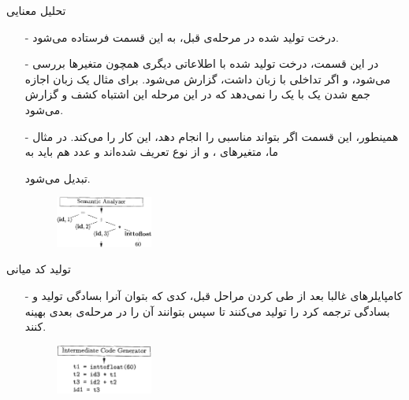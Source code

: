 \begin{frame}{تحلیل معنایی }
\begin{itemize}\itemr
\item[-]
درخت تولید شده در مرحله‌ی قبل، به این قسمت فرستاده می‌شود.

\item[-]
در این قسمت، درخت تولید شده با اطلاعاتی دیگری همچون 
متغیر‌ها بررسی می‌شود، و اگر تداخلی با زبان داشت، گزارش می‌شود. برای مثال یک زبان اجازه جمع شدن یک 
با یک
را نمی‌دهد که در این مرحله این اشتباه کشف و گزارش می‌شود.

\item[-]
همینطور، این قسمت اگر بتواند
مناسبی را انجام دهد، این کار را می‌کند. در مثال ما، متغیر‌های 
،
و 
از نوع
تعریف شده‌اند و عدد 
هم باید به 

تبدیل می‌شود.

\begin{figure}[H]
\begin{center}
\includegraphics[width=0.3\textwidth, height=0.31\textheight]{docs/images/semantic}
\end{center}
\end{figure}
\end{itemize}
\end{frame}


\begin{frame}{تولید کد میانی }
\begin{itemize}\itemr
\item[-]
کامپایلر‌های غالبا بعد از طی کردن مراحل قبل، کدی که بتوان آنرا بسادگی تولید و بسادگی ترجمه کرد را تولید می‌کنند تا سپس بتوانند آن را در مرحله‌ی بعدی بهینه کنند.
\vspace{5mm}
\begin{figure}[H]
\begin{center}
\includegraphics[width=0.3\textwidth, height=0.4\textheight, angle=1]{docs/images/intermediate}
\end{center}
\end{figure}
\end{itemize}
\end{frame}
